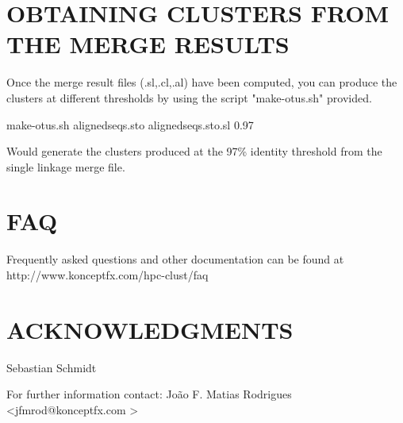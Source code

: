\documentclass[10pt,a4paper]{article}
\begin{document}
\section{OBTAINING CLUSTERS FROM THE MERGE RESULTS}

Once the merge result files (.sl,.cl,.al) have been computed, you can produce the clusters
at different thresholds by using the script "make-otus.sh" provided.

make-otus.sh alignedseqs.sto alignedseqs.sto.sl 0.97

Would generate the clusters produced at the 97\% identity threshold from the single linkage
merge file.


\section{FAQ}
Frequently asked questions and other documentation can be found at
http://www.konceptfx.com/hpc-clust/faq


\section*{ACKNOWLEDGMENTS}
Sebastian Schmidt




For further information contact: Jo\~ao F. Matias Rodrigues \textless jfmrod@konceptfx.com \textgreater
\end{document}

